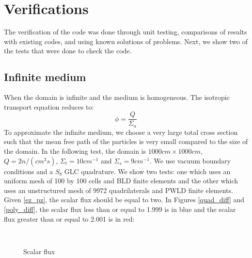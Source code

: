 \section{Verifications}
The verification of the code was done through unit testing, comparisons of
results with existing codes, and using known solutions of problems. Next, we
show two of the tests that were done to check the code.
\subsection{Infinite medium}
When the domain is infinite and the medium is homogeneous. The isotropic
transport equation reduces to:
\begin{equation}
  \phi = \frac{Q}{\Sigma_a}
  \label{ez_pz}
\end{equation}
To approximate the infinite medium, we choose a very large total cross section
such that the mean free path of the particles is very small compared to the
size of the domain. In the following test, the domain is $1000cm \times
1000cm$, $Q = 2 n/(cm^3s)$, $\Sigma_t = 10 cm^{-1}$ and $\Sigma_s = 9
cm^{-1}$. We use vacuum boundary conditions and a $S_{8}$ GLC quadrature.
We show two tests: one which uses an uniform mesh of 100 by 100 cells and BLD
finite elements and the other which uses an unstructured mesh of 9972
quadrilaterals and PWLD finite elements. Given \cref{ez_pz}, the scalar flux
should be equal to two. In Figures \ref{quad_diff} and \ref{poly_diff}, the 
scalar flux less than or equal to 1.999 is in blue and the scalar flux greater
than or equal to 2.001 is in red:
\begin{figure}[H]
  \centering
  \\
  \caption{Scalar flux}
\end{figure}

